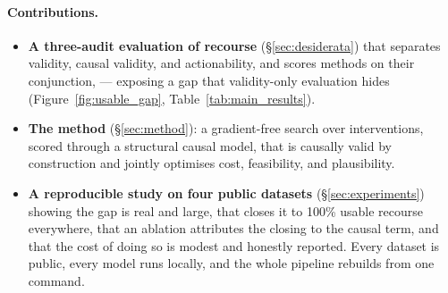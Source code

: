 \paragraph{Contributions.}
\begin{itemize}
  \item \textbf{A three-audit evaluation of recourse} (\S\ref{sec:desiderata})
    that separates validity, causal validity, and actionability, and scores
    methods on their conjunction, \Usable{} --- exposing a gap that
    validity-only evaluation hides (Figure~\ref{fig:usable_gap},
    Table~\ref{tab:main_results}).
  \item \textbf{The \cac{} method} (\S\ref{sec:method}): a gradient-free search
    over interventions, scored through a structural causal model, that is
    causally valid by construction and jointly optimises cost, feasibility, and
    plausibility.
  \item \textbf{A reproducible study on four public datasets}
    (\S\ref{sec:experiments}) showing the gap is real and large, that \cac{}
    closes it to 100\% usable recourse everywhere, that an ablation attributes
    the closing to the causal term, and that the cost of doing so is modest and
    honestly reported. Every dataset is public, every model runs locally, and the
    whole pipeline rebuilds from one command.
\end{itemize}
